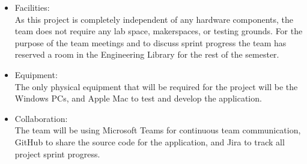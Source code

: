 \begin{itemize}
    \item Facilities:
    \\ As this project is completely independent of any hardware components, the team does not require any lab space, makerspaces, or testing grounds. For the purpose of the team meetings and to discuss sprint progress the team has reserved a room in the Engineering Library for the rest of the semester.
    \item Equipment:
    \\ The only physical equipment that will be required for the project will be the Windows PCs, and Apple Mac to test and develop the application. 
    \item Collaboration:
    \\ The team will be using Microsoft Teams for continuous team communication, GitHub to share the source code for the application, and Jira to track all project sprint progress.
\end{itemize}
 